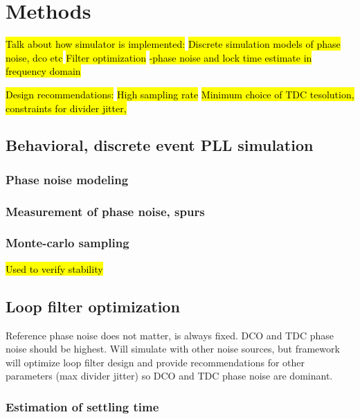 \section{Methods}\label{methods}
\hl{Talk about how simulator is implemented:}
\hl{Discrete simulation models of phase noise, dco etc}
\hl{Filter optimization}
\hl{-phase noise and lock time estimate in frequency domain}

\hl{Design recommendations:}
\hl{High sampling rate}
\hl{Minimum choice of TDC tesolution, constraints for divider jitter,}
\subsection{Behavioral, discrete event PLL simulation}
\subsubsection{Phase noise modeling}
\subsubsection{Measurement of phase noise, spurs}
\subsubsection{Monte-carlo sampling}
	\hl{Used to verify stability}

\subsection{Loop filter optimization}
	Reference phase noise does not matter, is always fixed.
	DCO and TDC phase noise should be highest. Will simulate with other noise sources, but framework will optimize loop filter design and provide recommendations for other parameters (max divider jitter) so DCO and TDC phase noise are dominant.
\subsubsection{Estimation of settling time}

